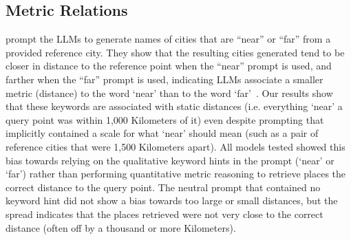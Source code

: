 \subsection{Metric Relations}

\citeauthor{Bhandari2023} prompt the LLMs to generate names of cities that are ``near'' or ``far'' from a provided reference city.
They show that the resulting cities generated tend to be closer in distance to the reference point when the ``near'' prompt is used, and farther when the ``far'' prompt is used, indicating LLMs associate a smaller metric (distance) to the word `near' than to the word `far'~\cite{Bhandari2023}.
Our results show that these keywords are associated with static distances (i.e. everything `near' a query point was within 1,000 Kilometers of it) even despite prompting that implicitly contained a scale for what `near' should mean (such as a pair of reference cities that were 1,500 Kilometers apart).
All models tested showed this bias towards relying on the qualitative keyword hints in the prompt (`near' or `far') rather than performing quantitative metric reasoning to retrieve places the correct distance to the query point.
The neutral prompt that contained no keyword hint did not show a bias towards too large or small distances, but the spread indicates that the places retrieved were not very close to the correct distance (often off by a thousand or more Kilometers).
